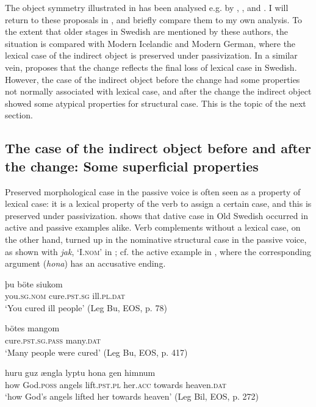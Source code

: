 \documentclass[output=paper]{langscibook}
\begin{document}
The object symmetry illustrated in  has been analysed e.g. by \citet{HolmbergPlatzack1995}, \citet{Platzack2005,Platzack2006}, and \citet{HaddicanHolmberg2019}. I will return to these proposals in , and briefly compare them to my own analysis. To the extent that older stages in Swedish are mentioned by these authors, the situation is compared with Modern Icelandic and Modern German, where the lexical case of the indirect object is preserved under passivization. In a similar vein, \citet{Falk1995, Falk1997} proposes that the change reflects the final loss of lexical case in Swedish. However, the case of the indirect object before the change had some properties not normally associated with lexical case, and after the change the indirect object showed some atypical properties for structural case. This is the topic of the next section.


\subsection{The case of the indirect object before and after the change: Some superficial properties}\label{sec:falk:2.2}


Preserved morphological case in the passive voice is often seen as a property of lexical case: it is a lexical property of the verb to assign a certain case, and this is preserved under passivization.  shows that dative case in Old Swedish occurred in active  and passive  examples alike. Verb complements without a lexical case, on the other hand, turned up in the nominative structural case in the passive voice, as shown with \textit{jak}, ‘I.\textsc{nom}’ in ; cf. the active example in , where the corresponding argument (\textit{hona}) has an accusative ending.

\ea%
    \label{ex:falk:3}
\ea\label{ex:falk:3a}
\gll þu              böte          siukom\\
      you.\textsc{sg.nom}  cure.\textsc{pst.sg}    ill.\textsc{pl}.\textsc{dat}\\
\glt ‘You cured ill people’ (Leg Bu, EOS, p. 78)

\ex\label{ex:falk:3b}
\gll bötes            mangom\\
      cure.\textsc{pst.sg.pass}  many.\textsc{dat}\\
\glt ‘Many people were cured’ (Leg Bu, EOS, p. 417)
\z
\ex%
    \label{ex:falk:4}

\ea\label{ex:falk:4a}
\gll huru  guz      ængla  lyptu      hona    gen    himnum\\
      how  God.\textsc{poss}  angels  lift.\textsc{pst}.\textsc{pl}  her.\textsc{acc}  towards  heaven.\textsc{dat}\\
\glt ‘how God’s angels lifted her towards heaven’ (Leg Bil, EOS, p. 272)
\end{document}

